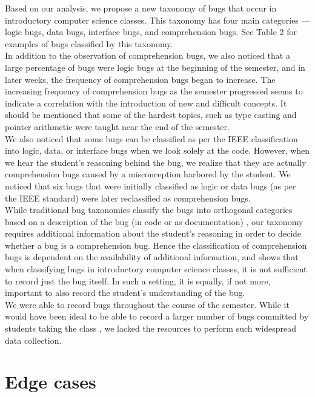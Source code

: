 \documentclass[11pt,letterpaper]{article}
\begin{document}
Based on our analysis, we propose a new taxonomy of bugs that occur in introductory computer science classes. This taxonomy has four main categories --- logic bugs, data bugs, interface bugs, and comprehension bugs. See Table 2 for examples of bugs classified by this taxonomy.\\

In addition to the observation of comprehension bugs, we also noticed that a large percentage of bugs were logic bugs at the beginning of the semester, and in later weeks, the frequency of comprehension bugs began to increase. The increasing frequency of comprehension bugs as the semester progressed seems to indicate a correlation with the introduction of new and difficult concepts. It should be mentioned that some of the hardest topics, such as type casting and pointer arithmetic were taught near the end of the semester.\\

We also noticed that some bugs can be classified as per the IEEE classification into logic, data, or interface bugs when we look solely at the code. However, when we hear the student's reasoning behind the bug, we realize that they are actually comprehension bugs caused by a misconception harbored by the student. We noticed that six bugs that were initially classified as logic or data bugs (as per the IEEE standard) were later reclassified as comprehension bugs.\\

While traditional bug taxonomies classify the bugs into orthogonal categories based on a description of the bug (in code or as documentation) \cite{Beizer90}, our taxonomy requires additional information about the student's reasoning in order to decide whether a bug is a comprehension bug. Hence the classification of comprehension bugs is dependent  on the availability of additional information, and shows that when classifying bugs in introductory computer science classes, it is not sufficient to record just the bug itself. In such a setting, it is equally, if not more, important to also record the student's understanding of the bug.\\

We were able to record \numtotal bugs throughout the course of the semester. While it would have been ideal to be able to record a larger number of bugs committed by students taking the class \cite{BryceCooleyHansenHayrapetyan10}, we lacked the resources to perform such widespread data collection.

\section{Edge cases}
\label{sec:edge}
\end{document}
